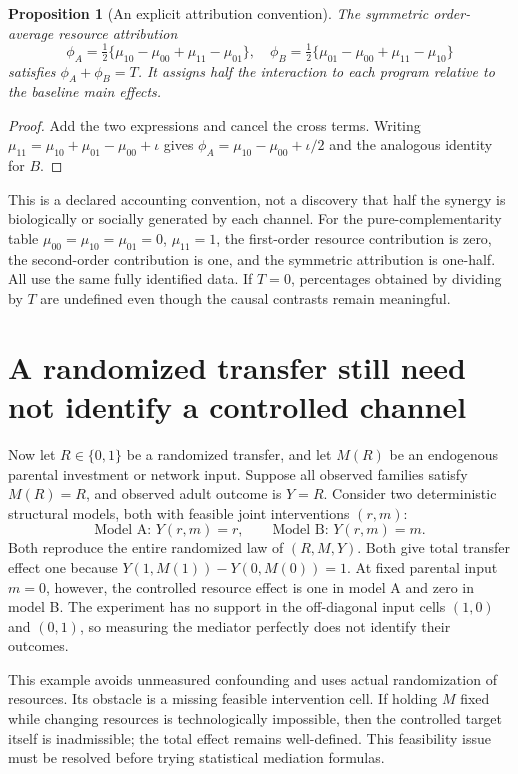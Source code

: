 \documentclass[11pt,a4paper]{article}
\newtheorem{proposition}[theorem]{Proposition}
\begin{document}
\begin{proposition}[An explicit attribution convention]
The symmetric order-average resource attribution
\[
 \phi_A=\tfrac12\{\mu_{10}-\mu_{00}+\mu_{11}-\mu_{01}\},
 \quad
 \phi_B=\tfrac12\{\mu_{01}-\mu_{00}+\mu_{11}-\mu_{10}\}
\]
satisfies $\phi_A+\phi_B=T$. It assigns half the interaction to each program relative to the baseline main effects.
\end{proposition}
\begin{proof}
Add the two expressions and cancel the cross terms. Writing
$\mu_{11}=\mu_{10}+\mu_{01}-\mu_{00}+\iota$ gives
$\phi_A=\mu_{10}-\mu_{00}+\iota/2$ and the analogous identity for $B$.
\end{proof}

This is a declared accounting convention, not a discovery that half the synergy is biologically or socially generated by each channel. For the pure-complementarity table $\mu_{00}=\mu_{10}=\mu_{01}=0$, $\mu_{11}=1$, the first-order resource contribution is zero, the second-order contribution is one, and the symmetric attribution is one-half. All use the same fully identified data. If $T=0$, percentages obtained by dividing by $T$ are undefined even though the causal contrasts remain meaningful.

\section{A randomized transfer still need not identify a controlled channel}
Now let $R\in\{0,1\}$ be a randomized transfer, and let $M(R)$ be an endogenous parental investment or network input. Suppose all observed families satisfy $M(R)=R$, and observed adult outcome is $Y=R$. Consider two deterministic structural models, both with feasible joint interventions $(r,m)$:
\[
 \text{Model A: }Y(r,m)=r,
 \qquad
 \text{Model B: }Y(r,m)=m.                                \tag{3}
\]
Both reproduce the entire randomized law of $(R,M,Y)$. Both give total transfer effect one because $Y(1,M(1))-Y(0,M(0))=1$. At fixed parental input $m=0$, however, the controlled resource effect is one in model A and zero in model B. The experiment has no support in the off-diagonal input cells $(1,0)$ and $(0,1)$, so measuring the mediator perfectly does not identify their outcomes.

This example avoids unmeasured confounding and uses actual randomization of resources. Its obstacle is a missing feasible intervention cell. If holding $M$ fixed while changing resources is technologically impossible, then the controlled target itself is inadmissible; the total effect remains well-defined. This feasibility issue must be resolved before trying statistical mediation formulas.
\end{document}
